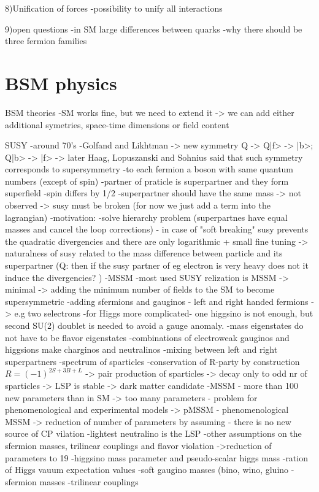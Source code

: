 8)Unification of forces
-possibility to unify all interactions

9)open questions
-in SM large differences between quarks
-why there should be three fermion families


\section{BSM physics}

BSM theories
-SM works fine, but we need to extend it -> we can add either additional symetries, space-time dimensions or field content

SUSY
-around 70's
-Golfand and Likhtman -> new symmetry Q -> Q|f> -> |b>; Q|b> -> |f> -> later Haag, Lopuszanski and Sohnius said that such symmetry corresponds to supersymmetry
-to each fermion a boson  with same quantum numbers (except of spin)
-partner of praticle is superpartner and they form superfield
-spin differs by 1/2
-superpartner should have the same mass -> not observed -> susy must be broken (for now we just add a term into the lagrangian)
-motivation:
	-solve hierarchy problem (superpartnes have equal masses and cancel the loop corrections) - in case of "soft breaking" susy prevents the quadratic divergencies and there are only logarithmic + small fine tuning
	-> naturalness of susy related to the mass difference between particle and its superpartner (Q: then if the susy partner of eg electron is very heavy does not it induce the divergencies? )
-MSSM
-most used SUSY relization is MSSM -> minimal -> adding the minimum number of fields to the SM to become supersymmetric
-adding sfermions and gauginos - left and right handed fermions -> e.g two selectrons
-for Higgs more complicated- one higgsino is not enough, but second SU(2) doublet is needed to avoid a gauge anomaly.
-mass eigenstates do not have to be flavor eigenstates
-combinations of electroweak gauginos and higgsions make charginos and neutralinos
-mixing between left and right superpartners 
-spectrum of sparticles
-conservation of R-party by construction $R=(-1)^{2S+3B+L} $
	-> pair production of sparticles
        -> decay only to odd nr of sparticles
        -> LSP is stable -> dark matter candidate
-MSSM - more than 100 new parameters than in SM
-> too many parameters - problem for phenomenological and experimental models
-> pMSSM - phenomenological MSSM -> reduction of number of parameters by assuming
	- there is no new source of CP vilation
	-lightest neutralino is the LSP
	-other assumptions on the sfermion masses, trilinear couplings and flavor violation
	->reduction of parameters to 19
		-higgsino mass parameter and pseudo-scalar higgs mass 
		-ration of Higgs vauum expectation values
		-soft gaugino masses (bino, wino, gluino
		-sfermion masses
		-trilinear couplings
